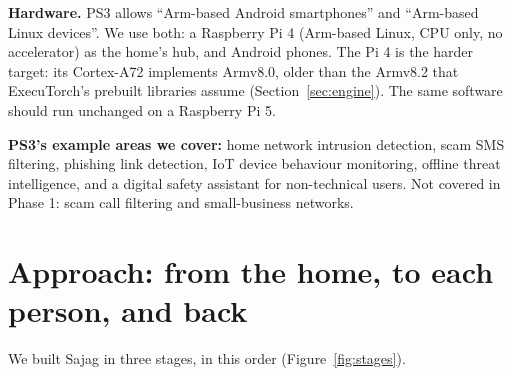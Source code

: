\documentclass[11pt,a4paper]{article}
\begin{document}
\textbf{Hardware.} PS3 allows ``Arm-based Android smartphones'' and ``Arm-based Linux devices''. We use both:
a Raspberry Pi 4 (Arm-based Linux, CPU only, no accelerator) as the home's hub, and Android phones. The Pi 4 is
the harder target: its Cortex-A72 implements Armv8.0, older than the Armv8.2 that ExecuTorch's prebuilt
libraries assume (Section~\ref{sec:engine}). The same software should run unchanged on a Raspberry Pi 5.

\textbf{PS3's example areas we cover:} home network intrusion detection, scam SMS filtering, phishing link
detection, IoT device behaviour monitoring, offline threat intelligence, and a digital safety assistant for
non-technical users. Not covered in Phase 1: scam call filtering and small-business networks.

\section{Approach: from the home, to each person, and back}
\label{sec:approach}

We built Sajag in three stages, in this order (Figure~\ref{fig:stages}).
\end{document}
